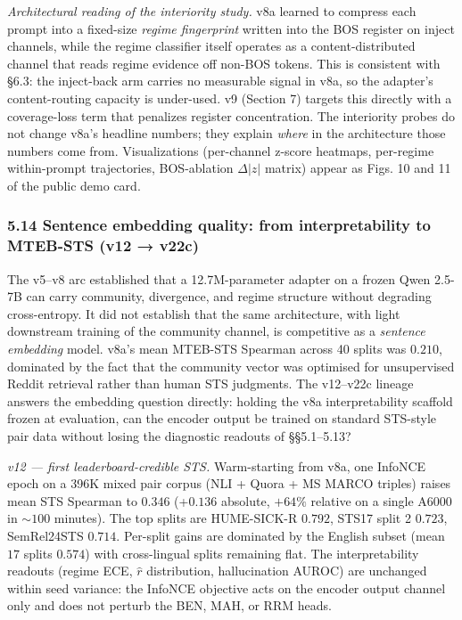 \documentclass[
  11pt]{article}
\begin{document}
\emph{Architectural reading of the interiority study.} v8a learned to
compress each prompt into a fixed-size \emph{regime fingerprint} written
into the BOS register on inject channels, while the regime classifier
itself operates as a content-distributed channel that reads regime
evidence off non-BOS tokens. This is consistent with §6.3: the
inject-back arm carries no measurable signal in v8a, so the adapter's
content-routing capacity is under-used. v9 (Section 7) targets this
directly with a coverage-loss term that penalizes register
concentration. The interiority probes do not change v8a's headline
numbers; they explain \emph{where} in the architecture those numbers
come from. Visualizations (per-channel z-score heatmaps, per-regime
within-prompt trajectories, BOS-ablation \(\Delta |z|\) matrix) appear
as Figs. 10 and 11 of the public demo card.

\subsubsection{5.14 Sentence embedding quality: from interpretability to
MTEB-STS (v12 →
v22c)}\label{sentence-embedding-quality-from-interpretability-to-mteb-sts-v12-v22c}

The v5--v8 arc established that a 12.7M-parameter adapter on a frozen
Qwen 2.5-7B can carry community, divergence, and regime structure
without degrading cross-entropy. It did not establish that the same
architecture, with light downstream training of the community channel,
is competitive as a \emph{sentence embedding} model. v8a's mean MTEB-STS
Spearman across 40 splits was \(0.210\), dominated by the fact that the
community vector was optimised for unsupervised Reddit retrieval rather
than human STS judgments. The v12--v22c lineage answers the embedding
question directly: holding the v8a interpretability scaffold frozen at
evaluation, can the encoder output be trained on standard STS-style pair
data without losing the diagnostic readouts of §§5.1--5.13?

\emph{v12 --- first leaderboard-credible STS.} Warm-starting from v8a,
one InfoNCE epoch on a 396K mixed pair corpus (NLI + Quora + MS MARCO
triples) raises mean STS Spearman to \(0.346\) (+\(0.136\) absolute,
\(+64\%\) relative on a single A6000 in \(\sim 100\) minutes). The top
splits are HUME-SICK-R \(0.792\), STS17 split 2 \(0.723\), SemRel24STS
\(0.714\). Per-split gains are dominated by the English subset (mean
\(17\) splits \(0.574\)) with cross-lingual splits remaining flat. The
interpretability readouts (regime ECE, \(\hat r\) distribution,
hallucination AUROC) are unchanged within seed variance: the InfoNCE
objective acts on the encoder output channel only and does not perturb
the BEN, MAH, or RRM heads.
\end{document}
